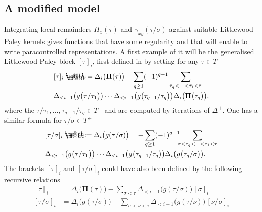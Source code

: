 \documentclass[11pt]{preprint}
\makeatletter
\def\PPi{\boldsymbol{\Pi}}
\newcommand*{\defeq}{\mathrel{\rlap{%
			\raisebox{0.3ex}{$\m@th\cdot$}}%
		\raisebox{-0.3ex}{$\m@th\cdot$}}%
	=}
\makeatother
\begin{document}
	
	
	
	
	
	
	
	\subsection{ A modified model} \label{subsect_modifmodel}
	
	
	Integrating local remainders ${ \Pi}_x(\tau)$ and ${\gamma}_{xy}(\tau/\sigma)$ against suitable Littlewood-Paley kernels gives functions that have some regularity and that will enable to write paracontrolled representations. A first example of it will be the generalised Littlewood-Paley block $[\tau]_i$, first defined in \cite{LocalExpansionsParacSystems} by setting for any $\tau\in T$
	\begin{equation}\begin{aligned}
			&[\tau]_i \defeq \Delta_i \big({ \PPi}(\tau)\big)
		- \sum_{q\geq 1} (-1)^{q-1} \sum_{\tau_q<\cdots<\tau_1<\tau} \\ &  \Delta_{<i-1}\big({ g}\big(\tau/\tau_1\big)\big)\cdots \Delta_{<i-1}\big({ g}\big(\tau_{q-1}/\tau_q\big)\big)  \Delta_i\big({ \PPi}\big(\tau_q\big)\big).
	\end{aligned}\end{equation}
where the $\tau / \tau_1,..., \tau_{q-1}/\tau_{q} \in T^+$ and are computed by iterations of $ \Delta^{\!+} $. 
One has a similar formula for $\tau/\sigma\in T^+$
	\begin{equation}\begin{split}
			&[\tau/\sigma]_i \defeq \Delta_i \big({ g}(\tau/\sigma)\big)
		\quad- \sum_{q \geq 1} (-1)^{q-1}  \hspace{-5pt}\sum_{\sigma<\tau_q<\cdots<\tau_1<\tau} \\ &  \Delta_{<i-1}\big({ g}\big(\tau/\tau_1\big)\big)\cdots \Delta_{<i-1}\big({ g}\big(\tau_{q-1}/\tau_q\big)\big)  \Delta_i\big({ g }\big(\tau_q/\sigma\big)\big).
	\end{split}\end{equation}
	The brackets $[\tau]_i$ and $[\tau/\sigma]_i$ could have also been defined by the following recursive relations
	\begin{equation} \begin{aligned}
		[\tau]_i & = \Delta_i\big({ \PPi}(\tau)\big) - \sum_{\sigma<\tau} \Delta_{<i-1} \big({ g}(\tau/\sigma)\big) \, [\sigma]_i
	\\
		[\tau/\sigma]_i & = \Delta_i\big({ g}(\tau/\sigma)\big) - \sum_{\sigma<\nu<\tau} \Delta_{<i-1} \big( { g}(\tau/\nu) \big) \, [\nu/\sigma]_i
		\end{aligned}
	\end{equation}
\end{document}
